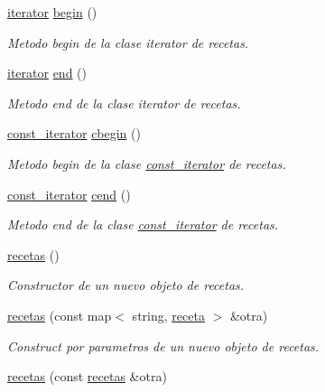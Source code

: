 \begin{DoxyCompactItemize}
\item 
\hyperlink{classrecetas_1_1iterator}{iterator} \hyperlink{classrecetas_a7b51f0b8e1d4a5d604cd0d8dd35356a1}{begin} ()
\begin{DoxyCompactList}\small\item\em Metodo begin de la clase iterator de recetas. \end{DoxyCompactList}\item 
\hyperlink{classrecetas_1_1iterator}{iterator} \hyperlink{classrecetas_a3860f782624bed9fffb7ec4eaddee97c}{end} ()
\begin{DoxyCompactList}\small\item\em Metodo end de la clase iterator de recetas. \end{DoxyCompactList}\item 
\hyperlink{classrecetas_1_1const__iterator}{const\+\_\+iterator} \hyperlink{classrecetas_affc2a9e77966eea6ad67b84fc60c6dff}{cbegin} ()
\begin{DoxyCompactList}\small\item\em Metodo begin de la clase \hyperlink{classrecetas_1_1const__iterator}{const\+\_\+iterator} de recetas. \end{DoxyCompactList}\item 
\hyperlink{classrecetas_1_1const__iterator}{const\+\_\+iterator} \hyperlink{classrecetas_a4eab868b8c3259a163d6c3d3e6424b39}{cend} ()
\begin{DoxyCompactList}\small\item\em Metodo end de la clase \hyperlink{classrecetas_1_1const__iterator}{const\+\_\+iterator} de recetas. \end{DoxyCompactList}\item 
\hyperlink{classrecetas_a464457ebc9cd2b5606c1eab9fcafe87c}{recetas} ()
\begin{DoxyCompactList}\small\item\em Constructor de un nuevo objeto de recetas. \end{DoxyCompactList}\item 
\hyperlink{classrecetas_ac59d36c24e824aa0a00d888466fecc06}{recetas} (const map$<$ string, \hyperlink{classreceta}{receta} $>$ \&otra)
\begin{DoxyCompactList}\small\item\em Construct por parametros de un nuevo objeto de recetas. \end{DoxyCompactList}\item 
\hyperlink{classrecetas_a7e071e6d0aab97f7810c3c987b5b89cc}{recetas} (const \hyperlink{classrecetas}{recetas} \&otra)

\end{DoxyCompactItemize}
